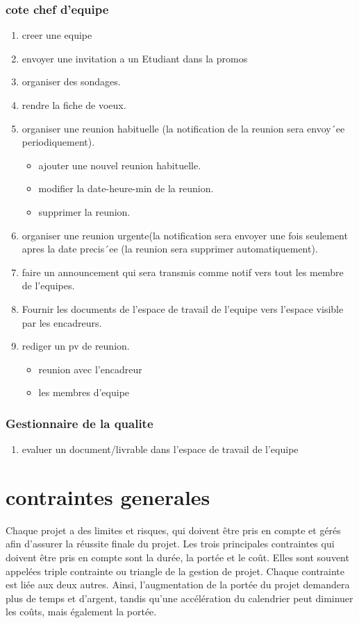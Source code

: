 \documentclass[11pt,fleqn]{book} %
\begin{document}
\subsubsection{cote chef d'equipe}
\begin{enumerate}
    \item creer une equipe
    \item envoyer une invitation a un Etudiant dans la promos
    \item organiser des sondages.
    \item rendre la fiche de voeux.
    \item organiser une reunion habituelle (la notification de la reunion sera envoy´ee periodiquement).
    \begin{itemize}
        \item ajouter une nouvel reunion habituelle.
        \item modifier la date-heure-min de la reunion.
        \item supprimer la reunion.
    \end{itemize}
    \item organiser une reunion urgente(la notification sera envoyer une fois seulement apres la date precis´ee (la reunion sera supprimer automatiquement).
    \item faire un announcement qui sera transmis comme notif vers tout les membre de l’equipes.
    \item Fournir les documents de l’espace de travail de l’equipe vers l’espace visible par les encadreurs.
    \item rediger un pv de reunion.
    \begin{itemize}
        \item reunion avec l’encadreur
        \item les membres d’equipe
    \end{itemize}
\end{enumerate}
\subsubsection{ Gestionnaire de la qualite}
\begin{enumerate}
    \item  evaluer un document/livrable dans l’espace de travail de l’equipe
\end{enumerate}
\section{contraintes generales} 
Chaque projet a des limites et risques, qui doivent être pris en compte et gérés afin 
d'assurer la réussite finale du projet. Les trois principales contraintes qui doivent être 
pris en compte sont la durée, la portée et le coût. Elles sont souvent appelées triple 
contrainte ou triangle de la gestion de projet. Chaque contrainte est liée aux deux 
autres. Ainsi, l'augmentation de la portée du projet demandera plus de temps et 
d'argent, tandis qu'une accélération du calendrier peut diminuer les coûts, mais 
également la portée.
\end{document}
